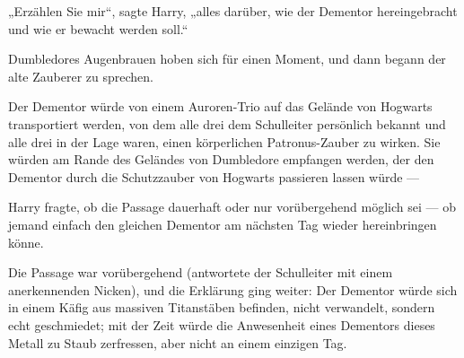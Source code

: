 „Erzählen Sie mir“, sagte Harry, „alles darüber, wie der Dementor hereingebracht und wie er bewacht werden soll.“

Dumbledores Augenbrauen hoben sich für einen Moment, und dann begann der alte Zauberer zu sprechen.

Der Dementor würde von einem Auroren-Trio auf das Gelände von Hogwarts transportiert werden, von dem alle drei dem Schulleiter persönlich bekannt und alle drei in der Lage waren, einen körperlichen Patronus-Zauber zu wirken. Sie würden am Rande des Geländes von Dumbledore empfangen werden, der den Dementor durch die Schutzzauber von Hogwarts passieren lassen würde —

Harry fragte, ob die Passage dauerhaft oder nur vorübergehend möglich sei — ob jemand einfach den gleichen Dementor am nächsten Tag wieder hereinbringen könne.

Die Passage war vorübergehend (antwortete der Schulleiter mit einem anerkennenden Nicken), und die Erklärung ging weiter: Der Dementor würde sich in einem Käfig aus massiven Titanstäben befinden, nicht verwandelt, sondern echt geschmiedet; mit der Zeit würde die Anwesenheit eines Dementors dieses Metall zu Staub zerfressen, aber nicht an einem einzigen Tag.

